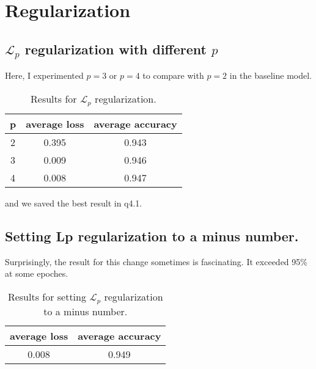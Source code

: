 \documentclass[12pt]{extarticle}
\begin{document}
\section{Regularization}

\subsection{$\mathcal{L}_p$ regularization with different $p$}

Here, I experimented $p = 3$ or $p=4$ to compare with $p=2$ in the baseline model.
\begin{table}[h]
	\centering
\begin{tabular}{ |c|c| c|}
	\hline
	p & average loss & average accuracy \\ 
	\hline
	2 & 0.395 & 0.943\\
	\hline
	3 & 0.009 & 0.946 \\  
	\hline
	4 & 0.008 & 0.947 \\  
	\hline
\end{tabular}

\caption{Results for $\mathcal{L}_p$ regularization.}
\label{table:8}
\end{table}

and we saved the best result in q4.1. 

\subsection{Setting Lp regularization to a minus number.}

Surprisingly, the result for this change sometimes is fascinating. It exceeded 95\% at some epoches.
\begin{table}[h]
	\centering
\begin{tabular}{ |c| c|}
	\hline
	average loss & average accuracy \\ 
	\hline
	0.008 & 0.949 \\  
	\hline
\end{tabular}

\caption{Results for setting $\mathcal{L}_p$ regularization to a minus number.}
\label{table:9}
\end{table}
\end{document}
